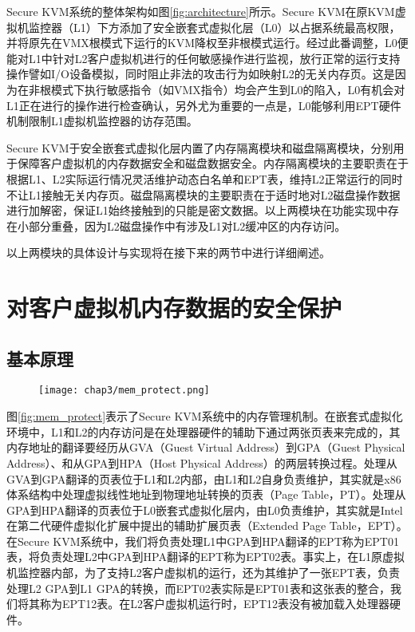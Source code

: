 Secure KVM系统的整体架构如图\ref{fig:architecture}所示。Secure KVM在原KVM虚拟机监控器（L1）下方添加了安全嵌套式虚拟化层（L0）以占据系统最高权限，并将原先在VMX根模式下运行的KVM降权至非根模式运行。经过此番调整，L0便能对L1中针对L2客户虚拟机进行的任何敏感操作进行监视，放行正常的运行支持操作譬如I/O设备模拟，同时阻止非法的攻击行为如映射L2的无关内存页。这是因为在非根模式下执行敏感指令（如VMX指令）均会产生到L0的陷入，L0有机会对L1正在进行的操作进行检查确认，另外尤为重要的一点是，L0能够利用EPT硬件机制限制L1虚拟机监控器的访存范围。

Secure KVM于安全嵌套式虚拟化层内置了内存隔离模块和磁盘隔离模块，分别用于保障客户虚拟机的内存数据安全和磁盘数据安全。内存隔离模块的主要职责在于根据L1、L2实际运行情况灵活维护动态白名单和EPT表，维持L2正常运行的同时不让L1接触无关内存页。磁盘隔离模块的主要职责在于适时地对L2磁盘操作数据进行加解密，保证L1始终接触到的只能是密文数据。以上两模块在功能实现中存在小部分重叠，因为L2磁盘操作中有涉及L1对L2缓冲区的内存访问。

以上两模块的具体设计与实现将在接下来的两节中进行详细阐述。

\section{对客户虚拟机内存数据的安全保护}

\subsection{基本原理}

\begin{figure}[!htp]
  \centering
  \texttt{[image: chap3/mem\_protect.png]}
\end{figure}

图\ref{fig:mem_protect}表示了Secure KVM系统中的内存管理机制。在嵌套式虚拟化环境中，L1和L2的内存访问是在处理器硬件的辅助下通过两张页表来完成的，其内存地址的翻译要经历从GVA（Guest Virtual Address）到GPA（Guest Physical Address）、和从GPA到HPA（Host Physical Address）的两层转换过程。处理从GVA到GPA翻译的页表位于L1和L2内部，由L1和L2自身负责维护，其实就是x86体系结构中处理虚拟线性地址到物理地址转换的页表（Page Table，PT）。处理从GPA到HPA翻译的页表位于L0嵌套式虚拟化层内，由L0负责维护，其实就是Intel在第二代硬件虚拟化扩展中提出的辅助扩展页表（Extended Page Table，EPT）。在Secure KVM系统中，我们将负责处理L1中GPA到HPA翻译的EPT称为EPT01表，将负责处理L2中GPA到HPA翻译的EPT称为EPT02表。事实上，在L1原虚拟机监控器内部，为了支持L2客户虚拟机的运行，还为其维护了一张EPT表，负责处理L2 GPA到L1 GPA的转换，而EPT02表实际是EPT01表和这张表的整合，我们将其称为EPT12表。在L2客户虚拟机运行时，EPT12表没有被加载入处理器硬件。

